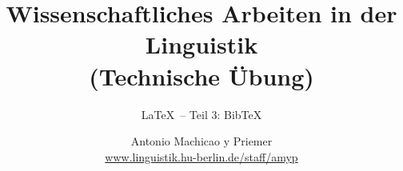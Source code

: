 



\title{
	Wissenschaftliches Arbeiten in der Linguistik\\
	(Technische Übung)
}

\subtitle{\LaTeX\ -- Teil 3: Bib\TeX }

\author[aMyP]{
	{\small Antonio Machicao y Priemer}
	\\
	{\scriptsize \url{www.linguistik.hu-berlin.de/staff/amyp}}
}


\date{ }






\begin{frame}
\HUtitle
\end{frame}





\nocite{Freitag&MyP15a}
\nocite{Knuth1986}
\nocite{Kopka94a}
\nocite{MyP17c}
\nocite{MyP&Kerkhof16a}
	




